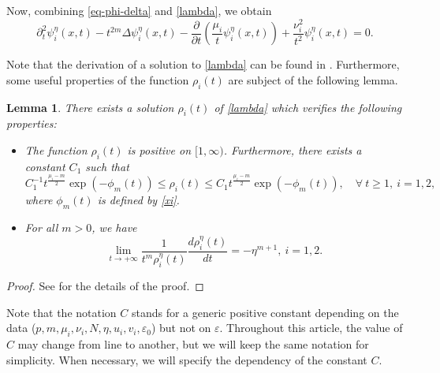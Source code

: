 \documentclass[12pt,leqno]{amsart}
\numberwithin{equation}{section}
\newtheorem{lem}{Lemma}[section]
\theoremstyle{remark}
\newcommand{\ep}{\varepsilon}
\def\d{\displaystyle}
\begin{document}
Now, combining \eqref{eq-phi-delta} and \eqref{lambda}, we obtain
\begin{equation}\label{lambda-eq}
\partial^2_t \psi^{\eta}_i(x, t)-t^{2m}\Delta \psi^{\eta}_i(x, t) -\frac{\partial}{\partial t}\left(\frac{\mu_i}{t}\psi^{\eta}_i(x, t)\right)+\frac{\nu_i^2}{t^2}\psi^{\eta}_i(x, t)=0.
\end{equation}



Note that the derivation of a solution to \eqref{lambda} can be found in \cite[Appendix A]{Our8}. Furthermore,   some useful properties of the function $\rho_i(t)$ are subject of the following lemma. 

\begin{lem}\label{lem-supp}
There exists a solution $\rho_i(t)$ of \eqref{lambda} which verifies the following properties:
\begin{itemize}
\item[{\bf (i)}] The function $\rho_i(t)$ is positive  on $[1,\infty)$. Furthermore,   there exists a constant $C_1$ such that   
\begin{equation}\label{est-rho}
C_1^{-1}t^{\frac{\mu_i-m}{2}} \exp(-\phi_{m}(t)) \le  \rho_i(t) \le C_1 t^{\frac{\mu_i-m}{2}} \exp(-\phi_{m}(t)), \quad \forall \ t \ge 1,\  i=1,2,
\end{equation}
where $\phi_{m}(t)$ is defined by \eqref{xi}.
\item[{\bf (ii)}] For all $m>0$, we have
\begin{equation}\label{lambda'lambda1}
\d \lim_{t \to +\infty} \frac{1}{t^{m} \rho^{\eta}_i(t)}\frac{d \rho^{\eta}_i(t)}{d t}=-\eta^{m+1},\  i=1,2.
\end{equation}
\end{itemize}
\end{lem}
\begin{proof}
See \cite[Appendix A]{Our8} for the details of the proof.
\end{proof}






Note that the notation $C$ stands for a generic positive constant depending on the data ($p,m,\mu_i,\nu_i,N,\eta,u_i,v_i,\ep_0$) but not on $\ep$.  Throughout this article, the value of $C$ may change from line to another, but we will keep the same notation for simplicity. When necessary, we will specify  the dependency of the constant $C$.\\
\end{document}
